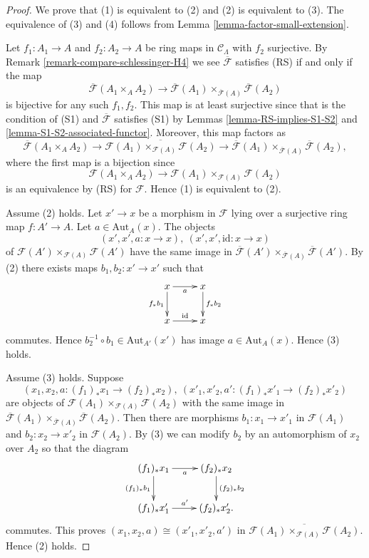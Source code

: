 \documentclass{stacks-project}
\theoremstyle{plain}
\theoremstyle{definition}
\theoremstyle{remark}
\numberwithin{equation}{subsection}
\begin{document}
\begin{proof}
We prove that (1) is equivalent to (2) and (2) is equivalent to (3).  The
equivalence of (3) and (4) follows from Lemma
\ref{lemma-factor-small-extension}.

\medskip\noindent
Let $f_1: A_1 \to A$ and $f_2: A_2 \to A$ be ring maps in
$\mathcal{C}_\Lambda$ with $f_2$ surjective. By
Remark \ref{remark-compare-schlessinger-H4}
we see $\overline{\mathcal{F}}$ satisfies (RS) if and
only if the map
$$
\overline{\mathcal{F}}(A_1 \times_A A_2) \to \overline{\mathcal
F}(A_1) \times_{\overline{\mathcal{F}}(A)} \overline{\mathcal{F}}(A_2)
$$
is bijective for any such $f_1, f_2$.
This map is at least surjective since that
is the condition of (S1) and $\overline{\mathcal{F}}$ satisfies (S1) by
Lemmas \ref{lemma-RS-implies-S1-S2} and
\ref{lemma-S1-S2-associated-functor}.
Moreover, this map factors as
$$
\overline{\mathcal{F}}(A_1 \times_A A_2)
\longrightarrow
\overline{\mathcal{F}(A_1) \times_{\mathcal{F}(A)} \mathcal{F}(A_2)}
\longrightarrow
\overline{\mathcal{F}}(A_1) \times_{\overline{\mathcal{F}}(A)}
\overline{\mathcal{F}}(A_2),
$$
where the first map is a bijection since
$$
\mathcal{F}(A_1 \times_A A_2)
\longrightarrow
\mathcal{F}(A_1) \times_{\mathcal{F}(A)} \mathcal{F}(A_2)
$$
is an equivalence by (RS) for $\mathcal{F}$. Hence (1) is equivalent to (2).

\medskip\noindent
Assume (2) holds. Let $x' \to x$ be a morphism in $\mathcal{F}$ lying
over a surjective ring map $f: A' \to A$. Let
$a \in \text{Aut}_A(x)$. The
objects
$$
(x', x', a : x \to x), \ (x', x', \text{id} : x \to x)
$$
of
$\mathcal{F}(A') \times_{\mathcal{F}(A)} \mathcal{F}(A')$
have the same image in
$\overline{\mathcal{F}}(A') \times_{\overline{\mathcal{F}}(A)}
\overline{\mathcal{F}}(A')$. By (2) there exists maps
$b_1, b_2 : x' \to x'$ such that
$$
\xymatrix{
x \ar[r]_a \ar[d]_{f_*b_1} & x \ar[d]^{f_*b_2} \\
x \ar[r]^{\text{id}} & x
}
$$
commutes. Hence $b_2^{-1} \circ b_1 \in \text{Aut}_{A'}(x')$ has image
$a \in \text{Aut}_A(x)$. Hence (3) holds.

\medskip\noindent
Assume (3) holds. Suppose
$$
(x_1, x_2, a : (f_1)_*x_1 \to (f_2)_*x_2),
\ (x'_1, x'_2, a' : (f_1)_*x'_1 \to (f_2)_*x'_2)
$$
are objects of
$\mathcal{F}(A_1) \times_{\mathcal{F}(A)} \mathcal{F}(A_2)$
with the same image in
$\overline{\mathcal{F}}(A_1) \times_{\overline{\mathcal{F}}(A)}
\overline{\mathcal{F}}(A_2)$. Then there are morphisms $b_1: x_1 \to
x'_1$ in $\mathcal{F}(A_1)$ and $b_2: x_2 \to x'_2$ in $\mathcal
F(A_2)$. By (3) we can modify $b_2$ by an automorphism of $x_2$ over $A_2$ so
that the diagram
$$
\xymatrix{
(f_1)_*x_1 \ar[r]_a \ar[d]_{(f_1)_*b_1} & (f_2)_*x_2 \ar[d]^{(f_2)_*b_2} \\
(f_1)_*x'_1 \ar[r]^{a'} & (f_2)_*x'_2.
}
$$
commutes. This proves $(x_1, x_2, a) \cong (x'_1, x'_2, a')$ in
$\overline{\mathcal{F}(A_1) \times_{\mathcal{F}(A)} \mathcal{F}(A_2)}$.
Hence (2) holds.
\end{proof}
\end{document}
